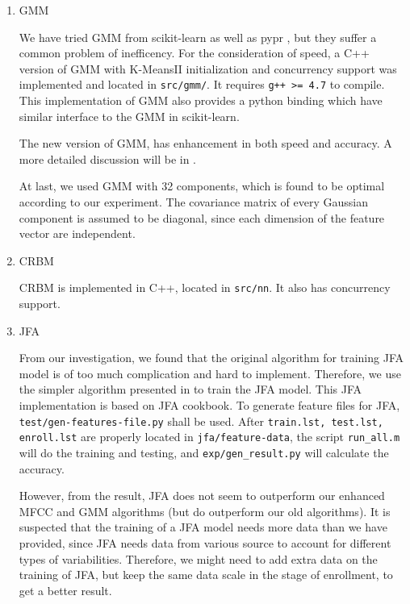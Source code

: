 \begin{enumerate}
    \item GMM

      We have tried GMM from scikit-learn \cite{scikit-learn} as well as pypr \cite{pypr}, but
      they suffer a common problem of inefficency.
      For the consideration of speed, a C++ version of GMM with K-MeansII initialization and
      concurrency support
      was implemented and located in \verb|src/gmm/|. It requires \verb|g++ >= 4.7| to compile.
      This implementation of GMM also provides a python binding which have similar interface to the GMM in
      scikit-learn.

      The new version of GMM, has enhancement in both speed and accuracy. A more detailed discussion
      will be in .

      At last, we used GMM with 32 components, which is found to be optimal according to our experiment.
      The covariance matrix of every Gaussian component is assumed to be diagonal,
      since each dimension of the feature vector are independent.

    \item CRBM

      CRBM is implemented in C++, located in \verb|src/nn|. It also has concurrency support.

    \item JFA

      From our investigation, we found that the original algorithm \cite{jfa-se} for training JFA model is of
      too much complication and hard to implement.
      Therefore, we use the simpler algorithm presented in \cite{jfa-study}
      to train the JFA model.
      This JFA implementation is based on JFA cookbook\cite{cookbook}.
      To generate feature files for JFA, \verb|test/gen-features-file.py| shall be used.
      After \verb|train.lst, test.lst, enroll.lst| are properly located in \verb|jfa/feature-data|,
      the script \verb|run_all.m| will do the training and testing, and \verb|exp/gen_result.py|
      will calculate the accuracy.

      However, from the result, JFA does not seem to outperform our enhanced MFCC and GMM algorithms
      (but do outperform our old algorithms). It is suspected that the training of a JFA model needs more data than
      we have provided, since JFA needs data from various source to account for different types of variabilities.
      Therefore, we might need to add extra data on the training of JFA, but keep the same data scale in the stage of enrollment,
      to get a better result.


\end{enumerate}
